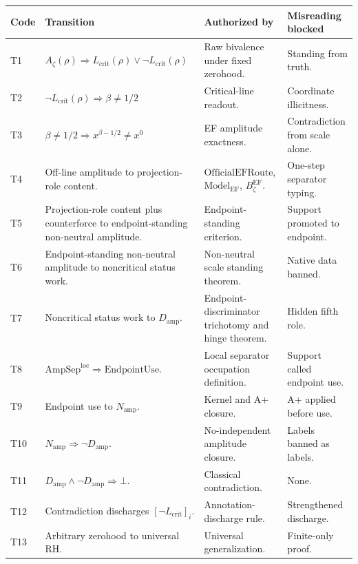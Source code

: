 \documentclass[11pt]{article}
\newcommand{\Az}{A_{\zeta}}
\newcommand{\Lcrit}{L_{\mathrm{crit}}}
\newcommand{\EndpointUse}{\mathrm{EndpointUse}}
\newcommand{\ModelEF}{\mathrm{Model}_{\mathrm{EF}}}
\newcommand{\OfficialEFRoute}{\mathrm{OfficialEFRoute}}
\newcommand{\AmpSepLoc}{\mathrm{AmpSep}^{\mathrm{loc}}}
\newcommand{\Damp}{D_{\mathrm{amp}}}
\newcommand{\Namp}{N_{\mathrm{amp}}}
\newcommand{\BzetaEF}{B^{\mathrm{EF}}_{\zeta}}
\begin{document}
\begingroup\small
\begin{longtable}{L{0.09\textwidth}L{0.31\textwidth}L{0.34\textwidth}L{0.16\textwidth}}
\toprule
\textbf{Code} & \textbf{Transition} & \textbf{Authorized by} & \textbf{Misreading blocked}\\
\midrule
T1 & \(\Az(\rho)\Rightarrow \Lcrit(\rho)\vee\neg\Lcrit(\rho)\) & Raw bivalence under fixed zerohood. & Standing from truth.\\
T2 & \(\neg\Lcrit(\rho)\Rightarrow \beta\ne1/2\) & Critical-line readout. & Coordinate illicitness.\\
T3 & \(\beta\ne1/2\Rightarrow x^{\beta-1/2}\ne x^0\) & EF amplitude exactness. & Contradiction from scale alone.\\
T4 & Off-line amplitude to projection-role content. & \(\OfficialEFRoute\), \(\ModelEF\), \(\BzetaEF\). & One-step separator typing.\\
T5 & Projection-role content plus counterforce to endpoint-standing non-neutral amplitude. & Endpoint-standing criterion. & Support promoted to endpoint.\\
T6 & Endpoint-standing non-neutral amplitude to noncritical status work. & Non-neutral scale standing theorem. & Native data banned.\\
T7 & Noncritical status work to \(\Damp\). & Endpoint-discriminator trichotomy and hinge theorem. & Hidden fifth role.\\
T8 & \(\AmpSepLoc\Rightarrow\EndpointUse\). & Local separator occupation definition. & Support called endpoint use.\\
T9 & Endpoint use to \(\Namp\). & Kernel and A+ closure. & A+ applied before use.\\
T10 & \(\Namp\Rightarrow\neg\Damp\). & No-independent amplitude closure. & Labels banned as labels.\\
T11 & \(\Damp\wedge\neg\Damp\Rightarrow\bot\). & Classical contradiction. & None.\\
T12 & Contradiction discharges \([\neg\Lcrit]_i\). & Annotation-discharge rule. & Strengthened discharge.\\
T13 & Arbitrary zerohood to universal RH. & Universal generalization. & Finite-only proof.\\
\bottomrule
\end{longtable}
\endgroup
\end{document}
